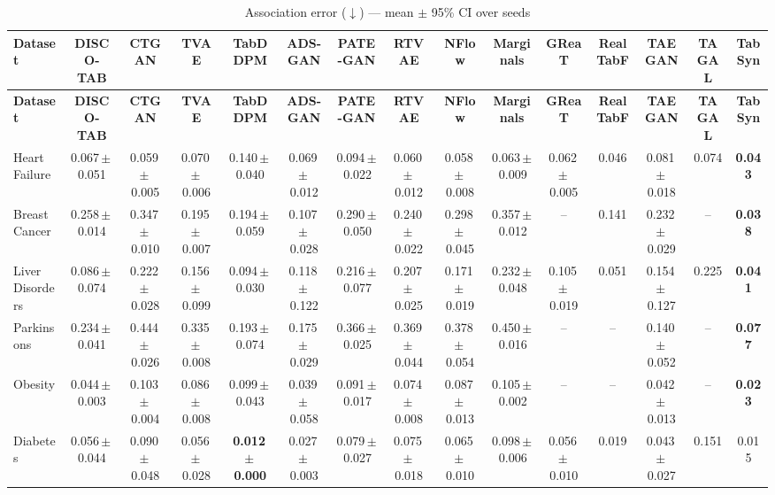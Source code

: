 \documentclass[8pt]{extarticle}
\begin{document}
\begin{longtable}{l*{14}{c}}
\caption{Association error ($\downarrow$) --- mean $\pm$ 95\% CI over seeds}\\
\toprule
\textbf{Dataset} & \textbf{DISCO-TAB} & \textbf{CTGAN} & \textbf{TVAE} & \textbf{TabDDPM} & \textbf{ADS-GAN} & \textbf{PATE-GAN} & \textbf{RTVAE} & \textbf{NFlow} & \textbf{Marginals} & \textbf{GReaT} & \textbf{RealTabF} & \textbf{TAEGAN} & \textbf{TAGAL} & \textbf{TabSyn} \\
\midrule
\endfirsthead
\toprule
\textbf{Dataset} & \textbf{DISCO-TAB} & \textbf{CTGAN} & \textbf{TVAE} & \textbf{TabDDPM} & \textbf{ADS-GAN} & \textbf{PATE-GAN} & \textbf{RTVAE} & \textbf{NFlow} & \textbf{Marginals} & \textbf{GReaT} & \textbf{RealTabF} & \textbf{TAEGAN} & \textbf{TAGAL} & \textbf{TabSyn} \\
\midrule
\endhead
\bottomrule
\endfoot
Heart Failure & 0.067\,$\pm$\,0.051 & 0.059\,$\pm$\,0.005 & 0.070\,$\pm$\,0.006 & 0.140\,$\pm$\,0.040 & 0.069\,$\pm$\,0.012 & 0.094\,$\pm$\,0.022 & 0.060\,$\pm$\,0.012 & 0.058\,$\pm$\,0.008 & 0.063\,$\pm$\,0.009 & 0.062\,$\pm$\,0.005 & 0.046 & 0.081\,$\pm$\,0.018 & 0.074 & \textbf{0.043} \\
Breast Cancer & 0.258\,$\pm$\,0.014 & 0.347\,$\pm$\,0.010 & 0.195\,$\pm$\,0.007 & 0.194\,$\pm$\,0.059 & 0.107\,$\pm$\,0.028 & 0.290\,$\pm$\,0.050 & 0.240\,$\pm$\,0.022 & 0.298\,$\pm$\,0.045 & 0.357\,$\pm$\,0.012 & -- & 0.141 & 0.232\,$\pm$\,0.029 & -- & \textbf{0.038} \\
Liver Disorders & 0.086\,$\pm$\,0.074 & 0.222\,$\pm$\,0.028 & 0.156\,$\pm$\,0.099 & 0.094\,$\pm$\,0.030 & 0.118\,$\pm$\,0.122 & 0.216\,$\pm$\,0.077 & 0.207\,$\pm$\,0.025 & 0.171\,$\pm$\,0.019 & 0.232\,$\pm$\,0.048 & 0.105\,$\pm$\,0.019 & 0.051 & 0.154\,$\pm$\,0.127 & 0.225 & \textbf{0.041} \\
Parkinsons & 0.234\,$\pm$\,0.041 & 0.444\,$\pm$\,0.026 & 0.335\,$\pm$\,0.008 & 0.193\,$\pm$\,0.074 & 0.175\,$\pm$\,0.029 & 0.366\,$\pm$\,0.025 & 0.369\,$\pm$\,0.044 & 0.378\,$\pm$\,0.054 & 0.450\,$\pm$\,0.016 & -- & -- & 0.140\,$\pm$\,0.052 & -- & \textbf{0.077} \\
Obesity & 0.044\,$\pm$\,0.003 & 0.103\,$\pm$\,0.004 & 0.086\,$\pm$\,0.008 & 0.099\,$\pm$\,0.043 & 0.039\,$\pm$\,0.058 & 0.091\,$\pm$\,0.017 & 0.074\,$\pm$\,0.008 & 0.087\,$\pm$\,0.013 & 0.105\,$\pm$\,0.002 & -- & -- & 0.042\,$\pm$\,0.013 & -- & \textbf{0.023} \\
Diabetes & 0.056\,$\pm$\,0.044 & 0.090\,$\pm$\,0.048 & 0.056\,$\pm$\,0.028 & \textbf{0.012\,$\pm$\,0.000} & 0.027\,$\pm$\,0.003 & 0.079\,$\pm$\,0.027 & 0.075\,$\pm$\,0.018 & 0.065\,$\pm$\,0.010 & 0.098\,$\pm$\,0.006 & 0.056\,$\pm$\,0.010 & 0.019 & 0.043\,$\pm$\,0.027 & 0.151 & 0.015 \\

\end{longtable}
\end{document}
